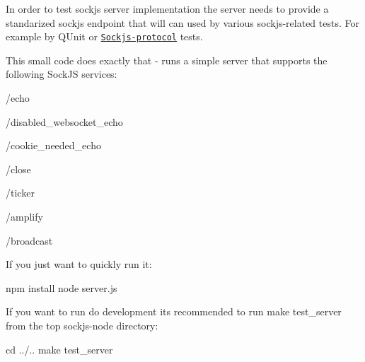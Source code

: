 In order to test sockjs server implementation the server needs to provide a standarized sockjs endpoint that will can used by various sockjs-\/related tests. For example by Q\+Unit or \href{https://github.com/sockjs/sockjs-protocol}{\tt Sockjs-\/protocol} tests.

This small code does exactly that -\/ runs a simple server that supports the following Sock\+JS services\+:


\begin{DoxyItemize}
\item {\ttfamily /echo}
\item {\ttfamily /disabled\+\_\+websocket\+\_\+echo}
\item {\ttfamily /cookie\+\_\+needed\+\_\+echo}
\item {\ttfamily /close}
\item {\ttfamily /ticker}
\item {\ttfamily /amplify}
\item {\ttfamily /broadcast}
\end{DoxyItemize}

If you just want to quickly run it\+: \begin{DoxyVerb}npm install
node server.js
\end{DoxyVerb}


If you want to run do development it\textquotesingle{}s recommended to run {\ttfamily make test\+\_\+server} from the top {\ttfamily sockjs-\/node} directory\+: \begin{DoxyVerb}cd ../..
make test_server\end{DoxyVerb}
 
